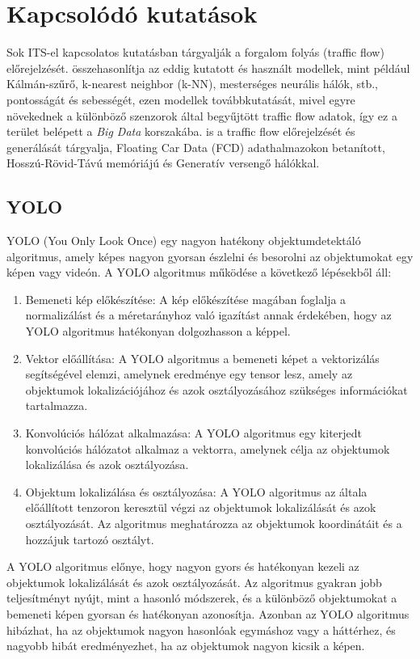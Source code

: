 \documentclass[12pt,a4paper]{article}
\begin{document}
\newpage
\section{Kapcsolódó kutatások}
Sok ITS-el kapcsolatos kutatásban tárgyalják a forgalom folyás (traffic flow) előrejelzését. \cite{PAUL2017177} összehasonlítja az eddig
kutatott és használt modellek, mint például Kálmán-szűrő, k-nearest neighbor (k-NN), mesterséges neurális hálók, stb., pontosságát és
sebességét, ezen modellek továbbkutatását, mivel egyre növekednek a különböző szenzorok által  begyűjtött traffic flow adatok, így ez a terület belépett
a \emph{Big Data} korszakába. \cite{10.1371/journal.pone.0253868} is a traffic flow előrejelzését és generálását tárgyalja, Floating Car Data (FCD)
adathalmazokon betanított, Hosszú-Rövid-Távú memóriájú és Generatív versengő hálókkal.
\subsection{YOLO}
YOLO (You Only Look Once) egy nagyon hatékony objektumdetektáló algoritmus, amely képes nagyon gyorsan észlelni és besorolni az objektumokat egy képen vagy videón.
A YOLO algoritmus működése a következő lépésekből áll:
\begin{enumerate}
    \item Bemeneti kép előkészítése: A kép előkészítése magában foglalja a normalizálást és a méretarányhoz való igazítást annak érdekében, hogy az YOLO algoritmus hatékonyan dolgozhasson a képpel.
    \item Vektor előállítása: A YOLO algoritmus a bemeneti képet a vektorizálás segítségével elemzi, amelynek eredménye egy tensor lesz, amely az objektumok lokalizációjához és azok osztályozásához szükséges információkat tartalmazza.
    \item Konvolúciós hálózat alkalmazása: A YOLO algoritmus egy kiterjedt konvolúciós hálózatot alkalmaz a vektorra, amelynek célja az objektumok lokalizálása és azok osztályozása.
    \item Objektum lokalizálása és osztályozása: A YOLO algoritmus az általa előállított tenzoron keresztül végzi az objektumok lokalizálását és azok osztályozását. Az algoritmus meghatározza az objektumok koordinátáit és a hozzájuk tartozó osztályt.
\end{enumerate}
A YOLO algoritmus előnye, hogy nagyon gyors és hatékonyan kezeli az objektumok lokalizálását és azok osztályozását. Az algoritmus gyakran jobb teljesítményt nyújt, mint a hasonló módszerek, és a különböző objektumokat a bemeneti képen gyorsan és hatékonyan azonosítja. Azonban az YOLO algoritmus hibázhat, ha az objektumok nagyon hasonlóak egymáshoz vagy a háttérhez, és nagyobb hibát eredményezhet, ha az objektumok nagyon kicsik a képen.
\end{document}
